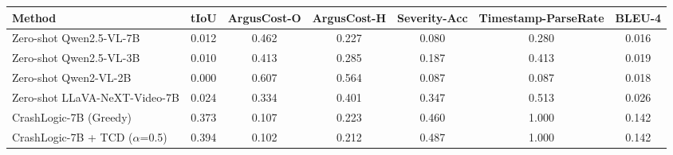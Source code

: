 \begin{tabular}{lcccccc}
\toprule
Method & tIoU & ArgusCost-O & ArgusCost-H & Severity-Acc & Timestamp-ParseRate & BLEU-4 \\
\midrule
Zero-shot Qwen2.5-VL-7B & 0.012 & 0.462 & 0.227 & 0.080 & 0.280 & 0.016 \\
Zero-shot Qwen2.5-VL-3B & 0.010 & 0.413 & 0.285 & 0.187 & 0.413 & 0.019 \\
Zero-shot Qwen2-VL-2B & 0.000 & 0.607 & 0.564 & 0.087 & 0.087 & 0.018 \\
Zero-shot LLaVA-NeXT-Video-7B & 0.024 & 0.334 & 0.401 & 0.347 & 0.513 & 0.026 \\
CrashLogic-7B (Greedy) & 0.373 & 0.107 & 0.223 & 0.460 & 1.000 & 0.142 \\
CrashLogic-7B + TCD ($\alpha$=0.5) & 0.394 & 0.102 & 0.212 & 0.487 & 1.000 & 0.142 \\
\bottomrule
\end{tabular}
